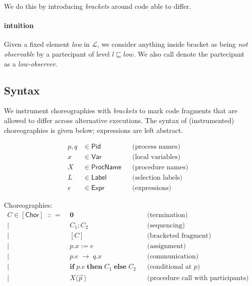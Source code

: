 \documentclass[12pt,a4paper,twoside]{book}
\newcommand{\metaDeff}{\mathrel{\mathop{::}}=}
\newcommand{\MCL}{\mathscr{L}}
\begin{document}
We do this by introducing \emph{brackets} around code able to differ.

\paragraph{intuition} Given a fixed element \textit{low} in $\MCL$, we consider anything inside bracket as being \emph{not observable} by a partecipant of level $l \sqsubseteq \textit{low}$. We also call denote the partecipant as a \emph{low-observer}.

\subsection{Syntax}
We instrument choreographies with \emph{brackets} to mark code fragments that are allowed to differ across alternative executions. The syntax of (instrumented) choreographies is given below; expressions are left abstract.

\begin{align*}
p,q &\in \mathsf{Pid}            && \text{(process names)}\\
x   &\in \mathsf{Var}          && \text{(local variables)}\\
X   &\in \mathsf{ProcName}       && \text{(procedure names)}\\
L   &\in \mathsf{Label}          && \text{(selection labels)}\\
e   &\in \mathsf{Expr}           && \text{(expressions)}
\end{align*}

\noindent Choreographies:
\[
\begin{array}{rcll}
C \in \mathsf{[Chor]} \;\metaDeff\;
  & \boldsymbol{0}                          & & \text{(termination)}\\
\mid& C_1 \mathbin{;} C_2                   & & \text{(sequencing)}\\
	\mid& [C] & & \text{(bracketed fragment)}\\
\mid& p.x \mathrel{:=} e                    & & \text{(assignment)}\\
\mid& p.e \;\rightarrow\; q.x               & & \text{(communication)}\\
\mid& \mathbf{if}\; p.e\; \mathbf{then}\; C_1\; \mathbf{else}\; C_2
                                           & & \text{(conditional at }p\text{)}\\
\mid& X\langle \vec{p}\,\rangle        & & \text{(procedure call with participants)}
\end{array}
\]
\end{document}
